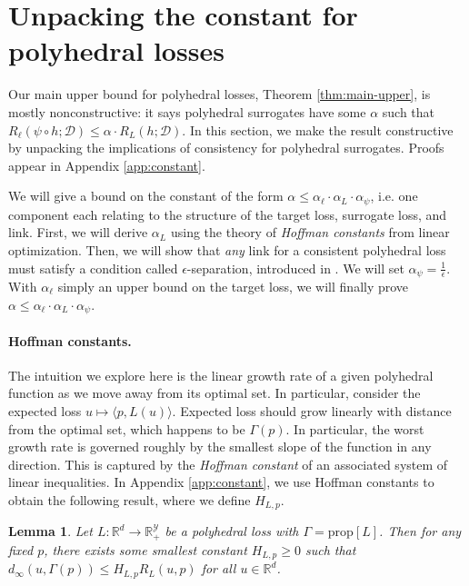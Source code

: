 \documentclass{article}
\newtheorem{lemma}{Lemma}
\theoremstyle{definition}\newtheorem{definition}{Definition}
\theoremstyle{definition}\newtheorem{assumption}{Assumption}
\newcommand{\reals}{\mathbb{R}}
\newcommand{\prop}[1]{\mathrm{prop}[#1]}
\newcommand{\D}{\mathcal{D}}
\newcommand{\Y}{\mathcal{Y}}
\newcommand{\inprod}[2]{\langle #1, #2 \rangle}%
\begin{document}
\section{Unpacking the constant for polyhedral losses} \label{sec:constant}

Our main upper bound for polyhedral losses, Theorem \ref{thm:main-upper}, is mostly nonconstructive: it says polyhedral surrogates have some $\alpha$ such that $R_{\ell}(\psi \circ h; \D) \leq \alpha \cdot R_L(h;\D)$.
In this section, we make the result constructive by unpacking the implications of consistency for polyhedral surrogates.
Proofs appear in Appendix \ref{app:constant}.

We will give a bound on the constant of the form $\alpha \leq \alpha_{\ell} \cdot \alpha_L \cdot \alpha_{\psi}$, i.e. one component each relating to the structure of the target loss, surrogate loss, and link.
First, we will derive $\alpha_L$ using the theory of \emph{Hoffman constants} from linear optimization.
Then, we will show that \emph{any} link for a consistent polyhedral loss must satisfy a condition called $\epsilon$-separation, introduced in \cite{finocchiaro2019embedding}.
We will set $\alpha_{\psi} = \frac{1}{\epsilon}$.
With $\alpha_{\ell}$ simply an upper bound on the target loss, we will finally prove $\alpha \leq \alpha_{\ell} \cdot \alpha_L \cdot \alpha_{\psi}$.

\paragraph{Hoffman constants.}
The intuition we explore here is the linear growth rate of a given polyhedral function as we move away from its optimal set.
In particular, consider the expected loss $u \mapsto \inprod{p}{L(u)}$.
Expected loss should grow linearly with distance from the optimal set, which happens to be $\Gamma(p)$.
In particular, the worst growth rate is governed roughly by the smallest slope of the function in any direction.
This is captured by the \emph{Hoffman constant} of an associated system of linear inequalities.
In Appendix \ref{app:constant}, we use Hoffman constants to obtain the following result, where we define $H_{L,p}$.
\begin{lemma} \label{lemma:hoffman-polyhedral}
  Let $L: \reals^d \to \reals_+^{\Y}$ be a polyhedral loss with $\Gamma = \prop{L}$.
  Then for any fixed $p$, there exists some smallest constant $H_{L,p} \geq 0$ such that $d_{\infty}(u,\Gamma(p)) \leq H_{L,p} R_L(u,p)$ for all $u \in \reals^d$.
\end{lemma}
\end{document}
